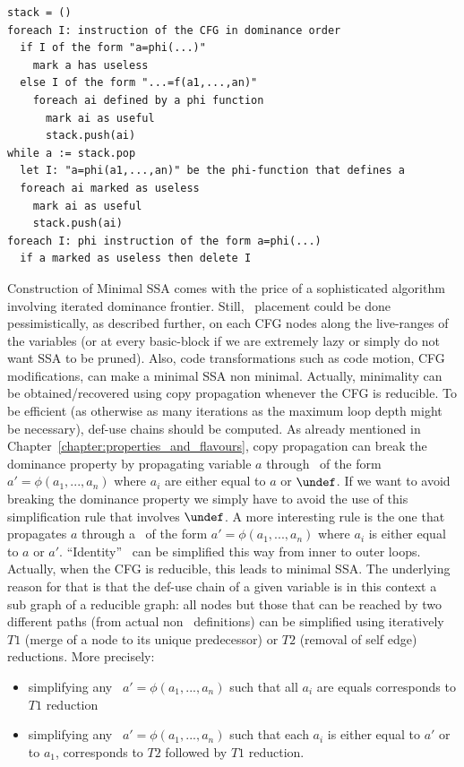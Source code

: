 \begin{verbatim}
stack = ()
foreach I: instruction of the CFG in dominance order
  if I of the form "a=phi(...)"
    mark a has useless
  else I of the form "...=f(a1,...,an)"
    foreach ai defined by a phi function
      mark ai as useful
      stack.push(ai)
while a := stack.pop
  let I: "a=phi(a1,...,an)" be the phi-function that defines a
  foreach ai marked as useless
    mark ai as useful
    stack.push(ai)
foreach I: phi instruction of the form a=phi(...)
  if a marked as useless then delete I  
\end{verbatim}

Construction of Minimal SSA comes with the price of a sophisticated algorithm involving iterated dominance frontier. 
Still, \phiops\ placement could be done pessimistically, as described further, on each CFG nodes along the live-ranges of the variables (or at every basic-block if we are extremely lazy or simply do not want SSA to be pruned). 
Also, code transformations such as code motion, CFG modifications, can make a minimal SSA non minimal.
Actually, minimality can be obtained/recovered using copy propagation whenever the CFG is reducible. 
To be efficient (as otherwise as many iterations as the maximum loop depth might be necessary), def-use chains should be computed. 
As already mentioned in Chapter~\ref{chapter:properties_and_flavours}, copy propagation can break the dominance property by propagating variable $a$ through \phiops\ of the form $a'=\phi(a_1,...,a_n)$ where $a_i$ are either equal to $a$ or $\undef$. 
If we want to avoid breaking the dominance property we simply have to avoid the use of this simplification rule that involves $\undef$. 
A more interesting rule is the one that propagates $a$ through a \phiop\ of the form $a'=\phi(a_1,...,a_n)$ where $a_i$ is either equal to $a$ or $a'$. 
``Identity'' \phiops\ can be simplified this way from inner to outer loops. 
Actually, when the CFG is reducible, this leads to minimal SSA. 
The underlying reason for that is that the def-use chain of a given variable is in this context a sub graph of a reducible graph: 
all nodes but those that can be reached by two different paths (from actual non \phiops\ definitions) can be simplified using iteratively $T1$ (merge of a node to its unique predecessor) or $T2$ (removal of self edge) reductions.
More precisely:
\begin{itemize}
\item simplifying any \phiop\ $a'=\phi(a_1,...,a_n)$ such that all $a_i$ are equals corresponds to $T1$ reduction
\item simplifying any \phiop\ $a'=\phi(a_1,...,a_n)$ such that each $a_i$ is either equal to $a'$ or to $a_1$, corresponds to $T2$ followed by $T1$ reduction.
\end{itemize}
